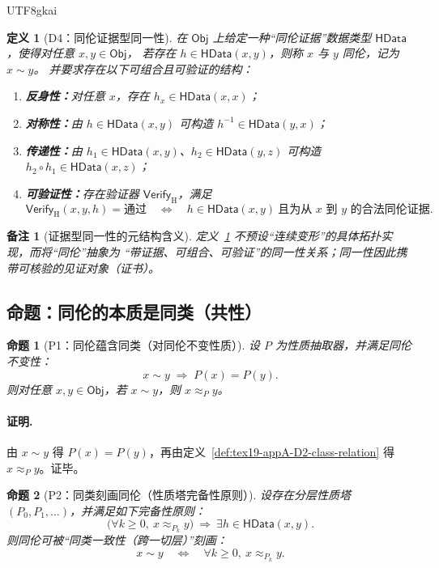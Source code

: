 \documentclass[12pt]{article}
\newtheorem{definition}{定义}[section]
\newtheorem{proposition}{命题}[section]
\newtheorem{remark}{备注}[section]
\begin{document}
\begin{CJK*}{UTF8}{gkai}
\begin{definition}[D4：同伦证据型同一性]
\label{def:tex19-appA-D4-homotopy-evidence}
在 $\mathsf{Obj}$ 上给定一种“同伦证据”数据类型 $\mathsf{HData}$，使得对任意 $x,y\in\mathsf{Obj}$，
若存在 $h\in\mathsf{HData}(x,y)$，则称 $x$ 与 $y$ 同伦，记为 $x\sim y$。
并要求存在以下可组合且可验证的结构：
\begin{enumerate}
  \item \textbf{反身性：}对任意 $x$，存在 $h_x\in\mathsf{HData}(x,x)$；
  \item \textbf{对称性：}由 $h\in\mathsf{HData}(x,y)$ 可构造 $h^{-1}\in\mathsf{HData}(y,x)$；
  \item \textbf{传递性：}由 $h_1\in\mathsf{HData}(x,y)$、$h_2\in\mathsf{HData}(y,z)$ 可构造
  $h_2\circ h_1\in\mathsf{HData}(x,z)$；
  \item \textbf{可验证性：}存在验证器 $\mathsf{Verify}_{\mathrm{H}}$，满足
  \[
  \mathsf{Verify}_{\mathrm{H}}(x,y,h)=\text{通过}
  \quad\Longleftrightarrow\quad
  h\in \mathsf{HData}(x,y)\ \text{且为从 $x$ 到 $y$ 的合法同伦证据}.
  \]
\end{enumerate}
\end{definition}

\begin{remark}[证据型同一性的元结构含义]
定义~\ref{def:tex19-appA-D4-homotopy-evidence} 不预设“连续变形”的具体拓扑实现，而将“同伦”抽象为
“带证据、可组合、可验证”的同一性关系；同一性因此携带可核验的见证对象（证书）。
\end{remark}

\subsection{命题：同伦的本质是同类（共性）}
\label{subsec:tex19-appA-homotopy-implies-class}

\begin{proposition}[P1：同伦蕴含同类（对同伦不变性质）]
\label{prop:tex19-appA-P1-homotopy-invariant}
设 $P$ 为性质抽取器，并满足同伦不变性：
\[
x\sim y \;\Rightarrow\; P(x)=P(y).
\]
则对任意 $x,y\in\mathsf{Obj}$，若 $x\sim y$，则 $x\approx_P y$。
\end{proposition}

\paragraph{证明.}
由 $x\sim y$ 得 $P(x)=P(y)$，再由定义~\ref{def:tex19-appA-D2-class-relation} 得 $x\approx_P y$。证毕。

\begin{proposition}[P2：同类刻画同伦（性质塔完备性原则）]
\label{prop:tex19-appA-P2-completeness}
设存在分层性质塔 $(P_0,P_1,\dots)$，并满足如下完备性原则：
\[
\bigl(\forall k\ge 0,\ x\approx_{P_k}y\bigr)\ \Rightarrow\ \exists h\in\mathsf{HData}(x,y).
\]
则同伦可被“同类一致性（跨一切层）”刻画：
\[
x\sim y
\quad\Longleftrightarrow\quad
\forall k\ge 0,\ x\approx_{P_k}y.
\]
\end{proposition}


\end{CJK*}
\end{document}
